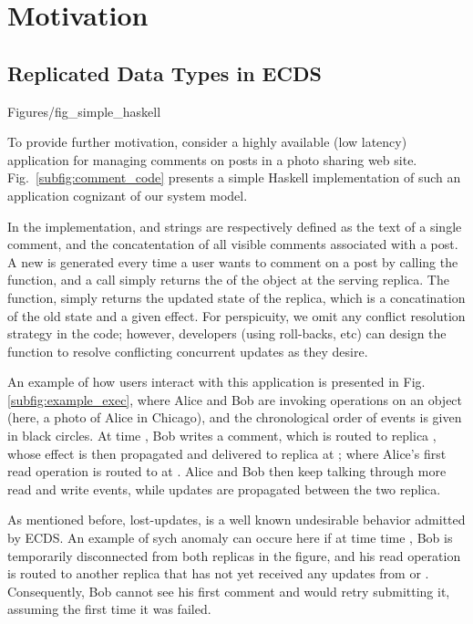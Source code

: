 \section{Motivation}
\label {sec:motiv}
\subsection{Replicated Data Types in ECDS }
 {Figures/fig_simple_haskell}

To provide further motivation, consider a highly available (low
latency) application for managing comments on posts in 
a photo sharing web site.  Fig.~\ref{subfig:comment_code}
presents a simple Haskell implementation of such an application
cognizant of our system model.  

In the implementation,
\effectC{} and \stateC{} strings are respectively defined as the text of a single comment, and 
the concatentation of all visible comments associated
with a post.
A new \effectC{} is generated every time a user wants to
comment on a post by calling the \writeC{} function, and a \readC{}
call simply returns the \stateC{} of the object at the serving
replica.
The \applyC{} function, simply returns the updated state of the replica,
which is a concatination of the old state and a given effect.
For perspicuity, we omit any
conflict resolution strategy in the code; however, developers (using
roll-backs, etc) can design the \applyC{} function to resolve
conflicting concurrent updates as they desire.

An example of how users interact with this application is presented
in Fig. \ref{subfig:example_exec}, where Alice and Bob are
invoking operations on an object (here, a photo of Alice in Chicago), and the 
chronological order of events is given in black circles.
At time , Bob
writes a comment, which is routed to replica , whose
effect is then propagated and delivered to replica  at ;
where Alice's first read operation is routed to at . 
Alice and Bob then keep talking
through more read and write events, while updates are propagated between
the two replica.

As mentioned before, lost-updates, is a well known  undesirable behavior admitted
by ECDS. 
An example of sych anomaly can occure here if at time 
time , Bob is temporarily
disconnected from both replicas in the figure, and his read operation
is routed to another replica that has not yet received any updates from
 or . Consequently,
Bob cannot see his first comment and would retry submitting it,
assuming the first time it was failed.

